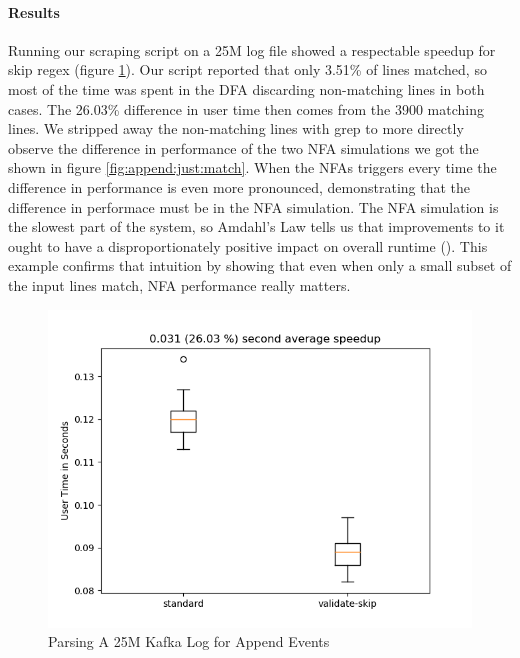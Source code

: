 \paragraph{Results}

Running our scraping script on a 25M log file showed a
respectable speedup for skip regex (figure \ref{fig:append}).
Our script reported that only 3.51\% of lines matched, so
most of the time was spent in the DFA discarding non-matching
lines in both cases. The 26.03\% difference in user
time then comes from the 3900 matching lines. We stripped
away the non-matching lines with grep to more directly observe
the difference in performance of the two NFA simulations we got
the shown in figure \ref{fig:append:just:match}.
When the NFAs triggers every time the difference in performance
is even more pronounced, demonstrating that the difference in performace
must be in the NFA simulation. The NFA simulation is the slowest part of
the system, so Amdahl's Law tells us that improvements to it ought to have
a disproportionately positive impact on overall runtime (\cite{Amdahl1967}).
This example confirms that intuition by showing that even when only a small
subset of the input lines match, NFA performance really matters.

\begin{figure}
\caption{Parsing A 25M Kafka Log for Append Events}
\label{fig:append}

\includegraphics{resources/append.png}
\end{figure}

